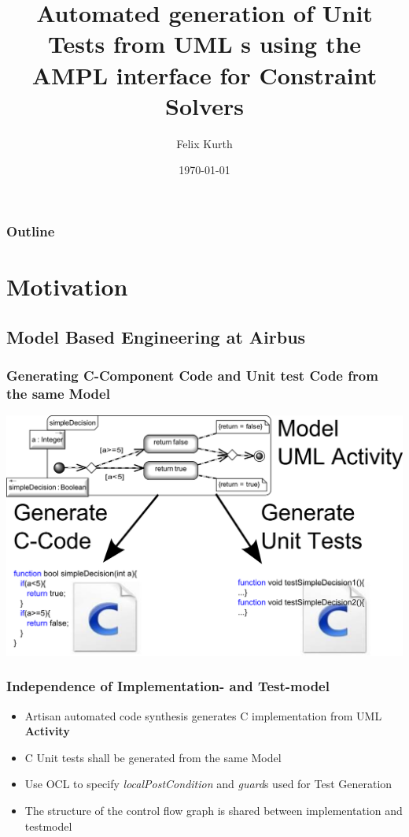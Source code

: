 \documentclass{beamer}
\title[Automated Unit Test Generation]{Automated generation of Unit Tests from UML \UMLType{Activity}s using the AMPL interface for Constraint Solvers }
\author[F. Kurth]{Felix Kurth}
\date[\today]{\today}
\newcommand{\UMLType}[1]{\textbf{#1}}
\begin{document}
\begin{frame}
\titlepage
\end{frame}

\begin{frame}
\frametitle{Outline} 
\tableofcontents  
\end{frame}


\section{Motivation}

\subsection{Model Based Engineering at Airbus}
\begin{frame}
\frametitle{Generating C-Component Code and Unit test Code from the same Model}
\includegraphics{../pics/Activity2Code+Tests.png}
\end{frame}

\begin{frame}
\frametitle{Independence of Implementation- and Test-model} 
\begin{itemize} 
\item Artisan automated code synthesis generates C implementation from UML \UMLType{Activity}
\item C Unit tests shall be generated from the same Model
\item Use OCL to specify \emph{localPostCondition} and \emph{guard}s used for Test Generation
\item The structure of the control flow graph is shared between implementation and testmodel
\end{itemize}
\end{frame} 
\end{document}
